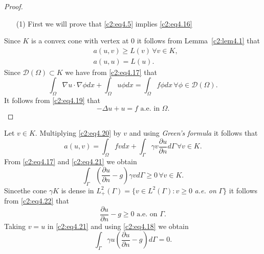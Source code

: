 \begin{proof}
\begin{enumerate}
\item[(1)]First we will prove that \eqref{c2:eq4.5} implies
  \eqref{c2:eq4.16}   
\end{enumerate}
Since $K$ is a convex cone with vertex at $0$ it follows from 
Lemma~\ref{c2:lem4.1} that  
\begin{align*}
& a (u, v) \geq L(v)\, \forall  v \in K, \tag{4.17}\label{c2:eq4.17}\\
& a(u, u) = L (u). \tag{4.18}\label{c2:eq4.18}
\end{align*}
 Since $\mathscr{D} (\Omega) \subset K$ we have from \eqref{c2:eq4.17}
 that   
\begin{equation}
\int_\Omega \nabla u \cdot \nabla \phi dx + \int_\Omega
u \phi dx = \int_\Omega f \phi dx\, \forall  \phi \in \mathscr{D}
(\Omega). \tag{4.19}\label{c2:eq4.19} 
 \end{equation} 
It follows from \eqref{c2:eq4.19} that 
\begin{equation}
- \Delta u + u = f \text{ a.e. in }
\Omega. \tag{4.20}\label{c2:eq4.20}   
\end{equation}  
\end{proof}

Let $v \in K$.  Multiplying \eqref{c2:eq4.20} by $v$ and using
\textit{Green's formula} it follows that  
\begin{equation}
a(u, v) = \int_\Omega fv dx + \int_\Gamma \gamma v \frac{\partial
  u}{\partial n} d \Gamma\, \forall  v \in K. \tag{4.21}\label{c2:eq4.21}  
\end{equation}
From \eqref{c2:eq4.17} and \eqref{c2:eq4.21} we obtain 
\begin{equation}
\int_\Gamma \left(\frac{\partial u }{\partial n} - g\right) \gamma v d \Gamma
\geq 0\, \forall  v \in K. \tag{4.22}\label{c2:eq4.22} 
\end{equation}
Since\pageoriginale  the cone $\gamma K$ is  dense in $L^2_+ (\Gamma) = \{v \in
L^2(\Gamma) : v \geq 0$ \textit{a.e. on} $\Gamma \}$ it follows from
\eqref{c2:eq4.22} that  
\begin{equation}
\frac{\partial u }{\partial n} - g \geq 0 \text{ a.e. on }
\Gamma. \tag{4.23}\label{c2:eq4.23} 
\end{equation}
Taking $v=u$ in \eqref{c2:eq4.21} and using \eqref{c2:eq4.18} we
obtain  
\begin{equation}
\int_\Gamma \gamma u \left(\frac{\partial u}{\partial n}- g\right) d \Gamma =
0. \tag{4.24}\label{c2:eq4.24} 
\end{equation}

